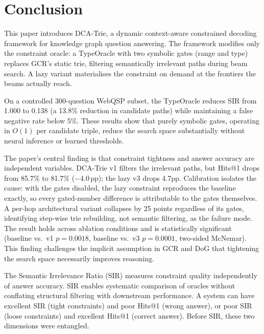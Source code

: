 
\section{Conclusion}
\label{sec:conclusion}

This paper introduces DCA-Trie, a dynamic context-aware constrained decoding framework
for knowledge graph question answering. The framework modifies only the constraint
oracle: a TypeOracle with two symbolic gates (range and type) replaces GCR's static
trie, filtering semantically irrelevant paths during beam search. A lazy variant
materialises the constraint on demand at the frontiers the beams actually reach.

On a controlled 300-question WebQSP subset, the TypeOracle reduces SIR from 1.000 to
0.138 (a 13.8\% reduction in candidate paths) while maintaining a false negative rate
below 5\%. These results show that purely symbolic gates, operating in $O(1)$
per candidate triple, reduce the search space substantially without neural
inference or learned thresholds.

The paper's central finding is that constraint tightness and answer accuracy are
independent variables. DCA-Trie v1 filters the irrelevant paths, but Hits@1 drops from
85.7\% to 81.7\% ($-4.0$\,pp); the lazy v3 drops 4.7pp. Calibration isolates the cause:
with the gates disabled, the lazy constraint reproduces the baseline exactly, so every
gated-number difference is attributable to the gates themselves. A per-hop architectural
variant collapses by 25 points regardless of its gates, identifying step-wise trie
rebuilding, not semantic filtering, as the failure mode. The result holds across
ablation conditions and is statistically significant (baseline vs.\ v1 $p = 0.0018$,
baseline vs.\ v3 $p = 0.0001$, two-sided McNemar). This finding challenges the implicit
assumption in GCR and DoG that tightening the search space necessarily improves
reasoning.

The Semantic Irrelevance Ratio (SIR) measures
constraint quality independently of answer accuracy. SIR enables systematic comparison
of oracles without conflating structural filtering with downstream performance. A system can have
excellent SIR (tight constraints) and poor Hits@1 (wrong answer), or poor SIR (loose
constraints) and excellent Hits@1 (correct answer). Before SIR, these two dimensions
were entangled.

